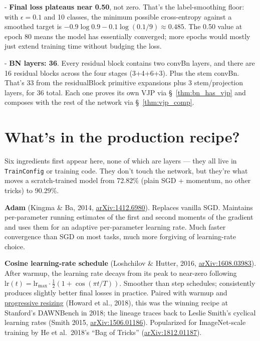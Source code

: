 - \textbf{Final loss plateaus near 0.50}, not zero. That's the
  label-smoothing floor: with $\epsilon = 0.1$ and 10 classes, the
  minimum possible cross-entropy against a smoothed target is
  $-0.9 \log 0.9 - 0.1 \log (0.1/9) \approx 0.485$. The 0.50 value
  at epoch 80 means the model has essentially converged; more
  epochs would mostly just extend training time without budging the
  loss.

- \textbf{BN layers: 36}. Every residual block contains two convBn
  layers, and there are 16 residual blocks across the four stages
  (3+4+6+3). Plus the stem convBn. That's 33 from the
  residualBlock primitive expansions plus 3 stem/projection layers,
  for 36 total. Each one proves its own VJP via
  \S~\ref{thm:bn_has_vjp} and composes with the rest of the network
  via \S~\ref{thm:vjp_comp}.

\section{What's in the production recipe?}

Six ingredients first appear here, none of which are layers --- they
all live in \texttt{TrainConfig} or training code. They don't touch
the network, but they're what moves a scratch-trained model from 72.82\%
(plain SGD + momentum, no other tricks) to 90.29\%.

\textbf{Adam} (Kingma \& Ba, 2014,
\href{https://arxiv.org/abs/1412.6980}{arXiv:1412.6980}). Replaces
vanilla SGD. Maintains
per-parameter running estimates of the first and second moments of
the gradient and uses them for an adaptive per-parameter learning
rate. Much faster convergence than SGD on most tasks, much more
forgiving of learning-rate choice.

\textbf{Cosine learning-rate schedule} (Loshchilov \& Hutter, 2016,
\href{https://arxiv.org/abs/1608.03983}{arXiv:1608.03983}).
After warmup, the learning rate decays from its peak to near-zero
following $\mathrm{lr}(t) = \mathrm{lr}_{\max} \cdot \tfrac{1}{2}(1 +
\cos(\pi t / T))$. Smoother than step schedules; consistently produces
slightly better final losses in practice. Paired with warmup and
\href{https://www.fast.ai/posts/2018-04-30-dawnbench-fastai.html}{progressive
resizing} (Howard et al., 2018), this was the winning recipe at
Stanford's DAWNBench in 2018; the lineage traces back to Leslie
Smith's cyclical learning rates (Smith 2015,
\href{https://arxiv.org/abs/1506.01186}{arXiv:1506.01186}).
Popularized for ImageNet-scale training by He et al.\ 2018's
``Bag of Tricks''
(\href{https://arxiv.org/abs/1812.01187}{arXiv:1812.01187}).

